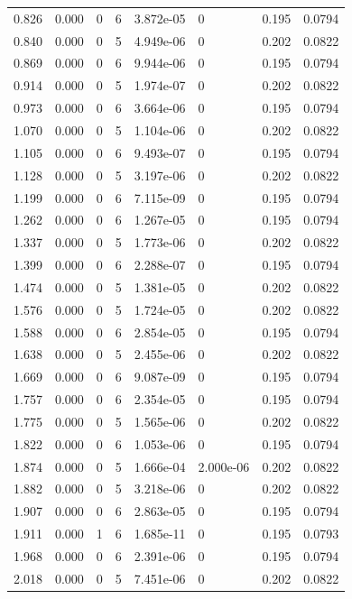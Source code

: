 \documentclass[preview]{standalone}
\begin{document}
{{\begin{tabular}{L{1.2cm}C{1.2cm} C{0.3cm}C{0.5cm} C{1.4cm}C{1.4cm} C{1.4cm}C{1.4cm}}
  0.826  &  0.000  & 0     &  6 &  3.872e-05  & 0  & 0.195 &  0.0794   \\ 
  0.840  &  0.000  & 0     &  5 &  4.949e-06  & 0  & 0.202 &  0.0822   \\ 
  0.869  &  0.000  & 0     &  6 &  9.944e-06  & 0  & 0.195 &  0.0794   \\ 
  0.914  &  0.000  & 0     &  5 &  1.974e-07  & 0  & 0.202 &  0.0822   \\ 
  0.973  &  0.000  & 0     &  6 &  3.664e-06  & 0  & 0.195 &  0.0794   \\ 
  1.070  &  0.000  & 0     &  5 &  1.104e-06  & 0  & 0.202 &  0.0822   \\ 
  1.105  &  0.000  & 0     &  6 &  9.493e-07  & 0  & 0.195 &  0.0794   \\ 
  1.128  &  0.000  & 0     &  5 &  3.197e-06  & 0  & 0.202 &  0.0822   \\ 
  1.199  &  0.000  & 0     &  6 &  7.115e-09  & 0  & 0.195 &  0.0794   \\ 
  1.262  &  0.000  & 0     &  6 &  1.267e-05  & 0  & 0.195 &  0.0794   \\ 
  1.337  &  0.000  & 0     &  5 &  1.773e-06  & 0  & 0.202 &  0.0822   \\ 
  1.399  &  0.000  & 0     &  6 &  2.288e-07  & 0  & 0.195 &  0.0794   \\ 
  1.474  &  0.000  & 0     &  5 &  1.381e-05  & 0  & 0.202 &  0.0822   \\ 
  1.576  &  0.000  & 0     &  5 &  1.724e-05  & 0  & 0.202 &  0.0822   \\ 
  1.588  &  0.000  & 0     &  6 &  2.854e-05  & 0  & 0.195 &  0.0794   \\ 
  1.638  &  0.000  & 0     &  5 &  2.455e-06  & 0  & 0.202 &  0.0822   \\ 
  1.669  &  0.000  & 0     &  6 &  9.087e-09  & 0  & 0.195 &  0.0794   \\ 
  1.757  &  0.000  & 0     &  6 &  2.354e-05  & 0  & 0.195 &  0.0794   \\ 
  1.775  &  0.000  & 0     &  5 &  1.565e-06  & 0  & 0.202 &  0.0822   \\ 
  1.822  &  0.000  & 0     &  6 &  1.053e-06  & 0  & 0.195 &  0.0794   \\ 
  1.874  &  0.000  & 0     &  5 &  1.666e-04  & 2.000e-06  & 0.202 &  0.0822   \\ 
  1.882  &  0.000  & 0     &  5 &  3.218e-06  & 0  & 0.202 &  0.0822   \\ 
  1.907  &  0.000  & 0     &  6 &  2.863e-05  & 0  & 0.195 &  0.0794   \\ 
  1.911  &  0.000  & 1     &  6 &  1.685e-11  & 0  & 0.195 &  0.0793   \\ 
  1.968  &  0.000  & 0     &  6 &  2.391e-06  & 0  & 0.195 &  0.0794   \\ 
  2.018  &  0.000  & 0     &  5 &  7.451e-06  & 0  & 0.202 &  0.0822   \\ 
\hline 
\end{tabular} 

}}
\end{document}
